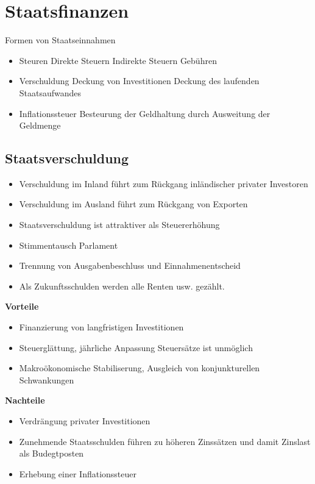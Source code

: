 \section{Staatsfinanzen}
Formen von Staatseinnahmen
\begin{itemize}
	\item Steuren
	\subitem Direkte Steuern
	\subitem Indirekte Steuern
	\subitem Gebühren
	\item Verschuldung
	\subitem Deckung von Investitionen
	\subitem Deckung des laufenden Staatsaufwandes
	\item Inflationssteuer
	\subitem Besteurung der Geldhaltung durch Ausweitung der Geldmenge
\end{itemize}
\subsection{Staatsverschuldung}
\begin{itemize}
	\item Verschuldung im Inland führt zum Rückgang inländischer privater Investoren
	\item Verschuldung im Ausland führt zum Rückgang von Exporten
	\item Staatsverschuldung ist attraktiver als Steuererhöhung
	\item Stimmentausch Parlament
	\item Trennung von Ausgabenbeschluss und Einnahmenentscheid
	\item Als Zukunftsschulden werden alle Renten usw. gezählt.
\end{itemize}
\begin{multicols}{2}
	\textbf{Vorteile}
	\begin{itemize}
		\item Finanzierung von langfristigen Investitionen
		\item Steuerglättung, jährliche Anpassung Steuersätze ist unmöglich
		\item Makroökonomische Stabiliserung, Ausgleich von konjunkturellen Schwankungen
	\end{itemize}
	\textbf{Nachteile}
	\begin{itemize}
		\item Verdrängung privater Investitionen
		\item Zunehmende Staatsschulden führen zu höheren Zinssätzen und damit Zinslast als Budegtposten
		\item Erhebung einer Inflationssteuer
	\end{itemize}
\end{multicols}
